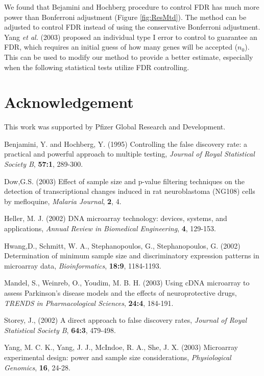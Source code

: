 \documentclass{bioinfo}
\begin{document}
We found that Bejamini and Hochberg procedure to control FDR has
much more power than Bonferroni adjustment (Figure
\ref{fig:ResMtd}). The method can be adjusted to control FDR
instead of using the conservative Bonferroni adjustment. Yang
\textit{et al.} (2003) proposed an individual type I error to
control to guarantee an FDR, which requires an initial guess of
how many genes will be accepted ($n_0$). This can be used to
modify our method to provide a better estimate, especially when
the following statistical tests utilize FDR controlling.


\section*{Acknowledgement}
This work was supported by Pfizer Global Research and Development.

\begin{thebibliography}{}

 Benjamini, Y. and Hochberg, Y. (1995)
  Controlling the false discovery rate: a practical and powerful
  approach to multiple testing, {\it Journal of Royal Statistical
    Society B}, {\bf 57:1}, 289-300.

 Dow,G.S. (2003) Effect of sample size and p-value filtering techniques on the detection of transcriptional changes induced in
  rat neuroblastoma (NG108) cells by mefloquine, {\it Malaria Journal}, {\bf 2}, 4.

 Heller, M. J. (2002) {DNA microarray technology: devices, systems, and applications},
  {\it Annual Review in Biomedical Engineering}, {\bf 4}, 129-153.

 Hwang,D., Schmitt, W. A., Stephanopoulos, G., Stephanopoulos, G. (2002)
  Determination of minimum sample size and discriminatory expression patterns in microarray data,
  {\it Bioinformatics}, {\bf 18:9}, 1184-1193.

 Mandel, S.,  Weinreb, O., Youdim, M. B. H. (2003)
  Using cDNA microarray to assess Parkinson's disease models and
  the effects of neuroprotective drugs, {\it TRENDS in Pharmacological Sciences}, {\bf 24:4}, 184-191.

 Storey, J., (2002)
  A direct approach to false discovery rates, {\it Journal of Royal Statistical Society B}, {\bf 64:3}, 479-498.

 Yang, M. C. K., Yang, J. J., McIndoe, R. A., She, J. X. (2003)
  Microarray experimental design: power and sample size considerations, {\it Physiological Genomics}, {\bf 16}, 24-28.
\end{thebibliography}
\end{document}
